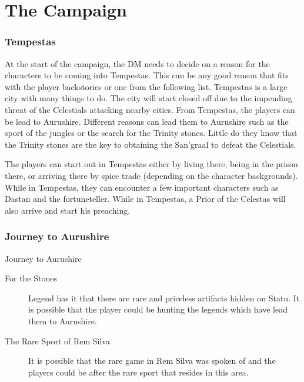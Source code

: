 \chapter{The Campaign}

\subsection{Tempestas}

At the start of the campaign, the DM needs to decide on a reason for the characters to be coming into Tempestas. This can be any good reason that fits with the player backstories or one from the following list. Tempestas is a large city with many things to do. The city will start closed off due to the impending threat of the Celestials attacking nearby cities. From Tempestas, the players can be lead to Aurushire. Different reasons can lead them to Aurushire such as the sport of the jungles or the search for the Trinity stones. Little do they know that the Trinity stones are the key to obtaining the San'graal to defeat the Celestials.

The players can start out in Tempestas either by living there, being in the prison there, or arriving there by spice trade (depending on the character backgrounds). While in Tempestas, they can encounter a few important characters such as Dastan and the fortuneteller. While in Tempestas, a Prior of the Celestas will also arrive and start his preaching. 

\subsection{Journey to Aurushire}

\begin{commentbox}{Journey to Aurushire}
	\begin{description}
		\item[For the Stones] Legend has it that there are rare and priceless artifacts hidden on Statu. It is possible that the player could be hunting the legends which have lead them to Aurushire.
		\item[The Rare Sport of Rem Silva] It is possible that the rare game in Rem Silva was spoken of and the players could be after the rare sport that resides in this area.
	\end{description}
\end{commentbox}

